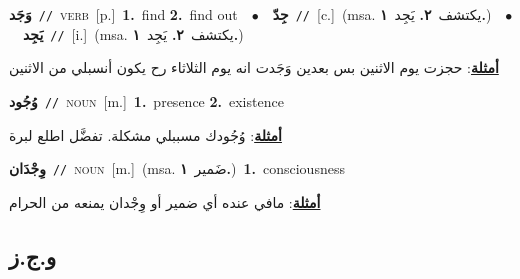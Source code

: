 \documentclass[10pt,a4paper,twoside]{article} %
\begin{document}
\begin{multicols}{2}
{\setlength\topsep{0pt}\textbf{\foreignlanguage{arabic}{وَجَد}}\ {\color{gray}\texttt{//}\color{black}}\ \textsc{verb}\ [p.]\ \textbf{1.}~find  \textbf{2.}~find out\ \ $\bullet$\ \ \setlength\topsep{0pt}\textbf{\foreignlanguage{arabic}{جِدّ}}\ {\color{gray}\texttt{//}\color{black}}\ [c.]\ \color{gray}(msa. \foreignlanguage{arabic}{يكتشف}~\foreignlanguage{arabic}{\textbf{٢.}}  \foreignlanguage{arabic}{يَجِد}~\foreignlanguage{arabic}{\textbf{١.}})\color{black}\ \ $\bullet$\ \ \setlength\topsep{0pt}\textbf{\foreignlanguage{arabic}{يَجِد}}\ {\color{gray}\texttt{//}\color{black}}\ [i.]\ \color{gray}(msa. \foreignlanguage{arabic}{يكتشف}~\foreignlanguage{arabic}{\textbf{٢.}}  \foreignlanguage{arabic}{يَجِد}~\foreignlanguage{arabic}{\textbf{١.}})\color{black}\  \begin{flushright}\color{gray}\foreignlanguage{arabic}{\textbf{\underline{\foreignlanguage{arabic}{أمثلة}}}: حجزت يوم الاثنين بس بعدين وَجَدت انه يوم الثلاثاء رح يكون أنسبلي من الاثنين}\end{flushright}\color{black}} \vspace{2mm}

{\setlength\topsep{0pt}\textbf{\foreignlanguage{arabic}{وُجُود}}\ {\color{gray}\texttt{//}\color{black}}\ \textsc{noun}\ [m.]\ \textbf{1.}~presence  \textbf{2.}~existence\  \begin{flushright}\color{gray}\foreignlanguage{arabic}{\textbf{\underline{\foreignlanguage{arabic}{أمثلة}}}: وُجُودك مسببلي مشكلة. تفضَّل اطلع لبرة}\end{flushright}\color{black}} \vspace{2mm}

{\setlength\topsep{0pt}\textbf{\foreignlanguage{arabic}{وِجْدَان}}\ {\color{gray}\texttt{//}\color{black}}\ \textsc{noun}\ [m.]\ \color{gray}(msa. \foreignlanguage{arabic}{ضَمير}~\foreignlanguage{arabic}{\textbf{١.}})\color{black}\ \textbf{1.}~consciousness\  \begin{flushright}\color{gray}\foreignlanguage{arabic}{\textbf{\underline{\foreignlanguage{arabic}{أمثلة}}}: مافي عنده أي ضمير أو وِجْدان يمنعه من الحرام}\end{flushright}\color{black}} \vspace{2mm}

\vspace{-3mm}
\subsection*{\color{blue}\foreignlanguage{arabic}{و.ج.ز}\color{blue}{}} 


\end{multicols}
\end{document}
